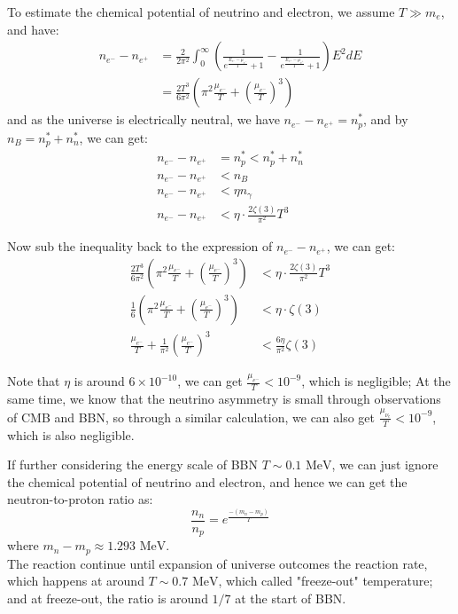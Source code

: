 \bigskip \noindent
\begin{foundation}
    To estimate the chemical potential of neutrino and electron, we assume $T \gg m_e$, and have:
    \begin{align*}
        n_{e^-} - n_{e^+} &= \frac{2}{2\pi^2} \int_0^\infty \left(\frac{1}{e^{\frac{E_{e^-} - \mu_{e^-}}{T}} + 1} - \frac{1}{e^{\frac{E_{e^+} - \mu_{e^+}}{T}} + 1}\right) E^2 dE \\
        &= \frac{2 T^3}{6 \pi^2} \left( \pi^2 \frac{\mu_{e^-}}{T} + \left( \frac{\mu_{e^-}}{T} \right)^3 \right)
    \end{align*}
    and as the universe is electrically neutral, we have $n_{e^-} - n_{e^+} = n_p^*$, and by $n_B = n_p^* + n_n^*$, we can get:
    \begin{align*}
        n_{e^-} - n_{e^+} &= n_p^* < n_p^* + n_n^*\\
        n_{e^-} - n_{e^+} &< n_B \\
        n_{e^-} - n_{e^+} &< \eta n_\gamma  \\
        n_{e^-} - n_{e^+} &< \eta \cdot \frac{2\zeta(3)}{\pi^2} T^3
    \end{align*}

    Now sub the inequality back to the expression of $n_{e^-} - n_{e^+}$, we can get:
    \begin{align*}
        \frac{2 T^3}{6 \pi^2} \left( \pi^2 \frac{\mu_{e^-}}{T} + \left( \frac{\mu_{e^-}}{T} \right)^3 \right) &< \eta \cdot \frac{2\zeta(3)}{\pi^2} T^3 \\
        \frac{1}{6} \left( \pi^2 \frac{\mu_{e^-}}{T} + \left( \frac{\mu_{e^-}}{T} \right)^3 \right) &< \eta \cdot \zeta(3) \\
        \frac{\mu_{e^-}}{T} + \frac{1}{\pi^2}\left( \frac{\mu_{e^-}}{T} \right)^3 &< \frac{6 \eta}{\pi^2} \zeta(3)
    \end{align*}

    Note that $\eta$ is around $6 \times 10^{-10}$, we can get $\frac{\mu_{e^-}}{T} < 10^{-9}$, which is negligible; At the same time, we know that the neutrino asymmetry is small through observations of CMB and BBN, so through a similar calculation, we can also get $\frac{\mu_{\nu_e}}{T} < 10^{-9}$, which is also negligible.
\end{foundation}

\bigskip \noindent
\begin{theory}
    If further considering the energy scale of BBN $T \sim 0.1 \text{ MeV}$, we can just ignore the chemical potential of neutrino and electron, and hence we can get the neutron-to-proton ratio as:
    \[
        \frac{n_n}{n_p} = e^{\frac{-(m_n - m_p)}{T}} 
    \] 
    where $m_n - m_p \approx 1.293 \text{ MeV}$. \\

    The reaction continue until expansion of universe outcomes the reaction rate, which happens at around $T \sim 0.7 \text{ MeV}$, which called "freeze-out" temperature; and at freeze-out, the ratio is around $1/7$ at the start of BBN.
\end{theory}




